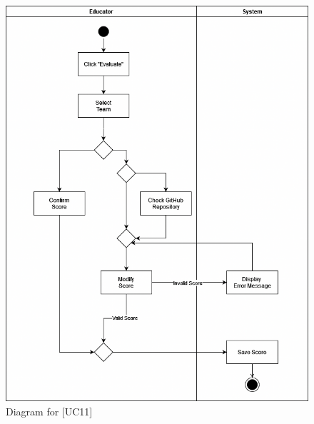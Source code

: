 \documentclass[12pt,oneside,a4paper]{article}
\begin{document}
\begin{figure}[htbp]
    \centering
    \includegraphics[width=1\linewidth]{Images/Diagrams/Evaluate.png}
    \caption{Diagram for [UC11]}
    \label{fig:enter-label}
\end{figure}

\clearpage
\end{document}
